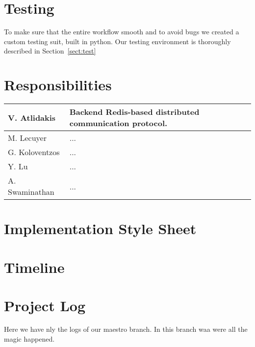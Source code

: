 \section{Testing}
To make sure that the entire workflow smooth and to avoid bugs we created a
custom testing suit, built in python. Our testing environment is thoroughly
described in Section~\ref{sect:test}


\section{Responsibilities}
\begin{center}
    \begin{tabular}{ | l || l |}
    \hline
    V. Atlidakis & Backend Redis-based distributed communication protocol.\\ \hline
    M. Lecuyer & ... \\ \hline
    G. Koloventzos & ... \\
    Y. Lu & ...  \\
    A. Swaminathan  &  ... \\
    \hline
    \end{tabular}
\end{center}

\section{Implementation Style Sheet}

\section{Timeline}


\section{Project Log}
Here we have nly the logs of our maestro branch. In this branch waa
were all the magic happened.

